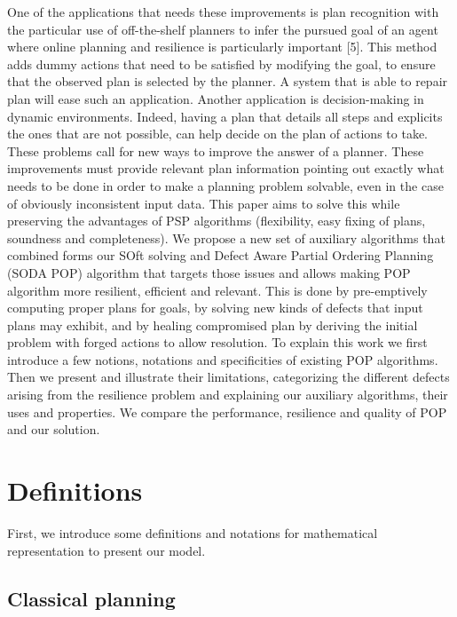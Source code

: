 \documentclass[]{article}
\begin{document}
One of the applications that needs these improvements is plan
recognition with the particular use of off-the-shelf planners to infer
the pursued goal of an agent where online planning and resilience is
particularly important {[}5{]}. This method adds dummy actions that need
to be satisfied by modifying the goal, to ensure that the observed plan
is selected by the planner. A system that is able to repair plan will
ease such an application. Another application is decision-making in
dynamic environments. Indeed, having a plan that details all steps and
explicits the ones that are not possible, can help decide on the plan of
actions to take. These problems call for new ways to improve the answer
of a planner. These improvements must provide relevant plan information
pointing out exactly what needs to be done in order to make a planning
problem solvable, even in the case of obviously inconsistent input data.
This paper aims to solve this while preserving the advantages of PSP
algorithms (flexibility, easy fixing of plans, soundness and
completeness). We propose a new set of auxiliary algorithms that
combined forms our SOft solving and Defect Aware Partial Ordering
Planning (SODA POP) algorithm that targets those issues and allows
making POP algorithm more resilient, efficient and relevant. This is
done by pre-emptively computing proper plans for goals, by solving new
kinds of defects that input plans may exhibit, and by healing
compromised plan by deriving the initial problem with forged actions to
allow resolution. To explain this work we first introduce a few notions,
notations and specificities of existing POP algorithms. Then we present
and illustrate their limitations, categorizing the different defects
arising from the resilience problem and explaining our auxiliary
algorithms, their uses and properties. We compare the performance,
resilience and quality of POP and our solution.

\section{Definitions}\label{definitions}

First, we introduce some definitions and notations for mathematical
representation to present our model.

\subsection{Classical planning}\label{classical-planning}
\end{document}
